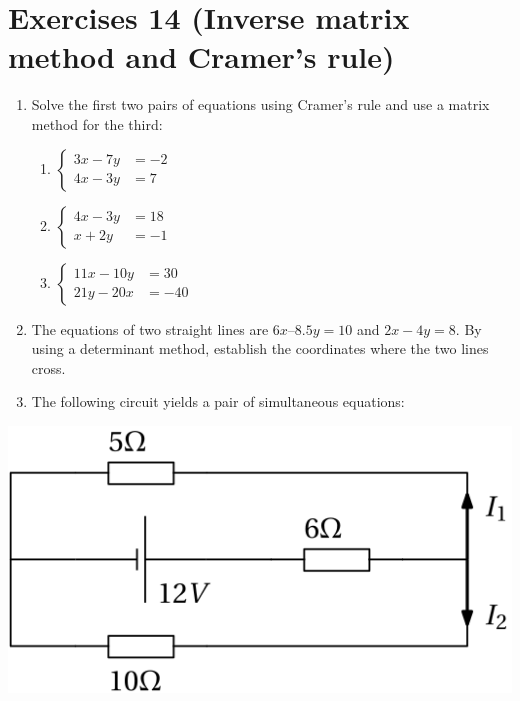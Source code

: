 \documentclass[
  12pt,
  oneside]{book}
\providecommand{\tightlist}{%
  \setlength{\itemsep}{0pt}\setlength{\parskip}{0pt}}
\theoremstyle{definition}
\theoremstyle{definition}
\theoremstyle{definition}
\theoremstyle{definition}
\theoremstyle{remark}
\begin{document}
\hypertarget{exercises-14-inverse-matrix-method-and-cramers-rule}{%
\chapter*{Exercises 14 (Inverse matrix method and Cramer's rule)}\label{exercises-14-inverse-matrix-method-and-cramers-rule}}

\begin{enumerate}
\def\labelenumi{\arabic{enumi}.}
\item
  Solve the first two pairs of equations using Cramer's rule and use a matrix method for the third:

  \begin{enumerate}
  \def\labelenumii{\roman{enumii})}
  \tightlist
  \item
    \(\left\{\begin{aligned}3x-7y&=-2\\4x-3y&=7\end{aligned}\right.\)
  \item
    \(\left\{\begin{aligned}4x-3y&=18\\ x+2y&=-1\end{aligned}\right.\)
  \item
    \(\left\{\begin{aligned}11x-10y&=30\\21y-20x&=-40\end{aligned}\right.\)
  \end{enumerate}
\item
  The equations of two straight lines are \(6x – 8.5y = 10\) and \(2x - 4y = 8\). By using a determinant method, establish the coordinates where the two lines cross.
\item
  The following circuit yields a pair of simultaneous equations:
\end{enumerate}

\begin{center}\includegraphics{t13-circuit} \end{center}
\end{document}
